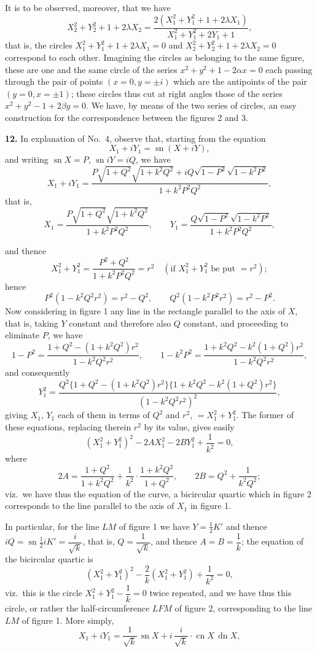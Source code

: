 \documentclass[11pt,a4paper]{article}
\providecommand{\sn}{\operatorname{sn}}
\providecommand{\cn}{\operatorname{cn}}
\providecommand{\dn}{\operatorname{dn}}
\begin{document}
It is to be observed, moreover, that we have
\[
X_2^2 + Y_2^2 + 1 + 2\lambda X_2 = \frac{2(X_1^2 + Y_1^2 + 1 + 2\lambda X_1)}{X_1^2 + Y_1^2 + 2 Y_1 + 1},
\]
that is, the circles $X_1^2 + Y_1^2 + 1 + 2\lambda X_1 = 0$ and $X_2^2 + Y_2^2 + 1 + 2\lambda X_2 = 0$ correspond to each other. Imagining the circles as belonging to the same figure, these are one and the same circle of the series $x^2 + y^2 + 1 - 2\alpha x = 0$ each passing through the pair of points $(x = 0, y = \pm i)$ which are the antipoints of the pair $(y = 0, x = \pm 1)$; these circles thus cut at right angles those of the series $x^2 + y^2 - 1 + 2\beta y = 0$. We have, by means of the two series of circles, an easy construction for the correspondence between the figures 2 and 3.

\textbf{12.} In explanation of No.~4, observe that, starting from the equation
\[
X_1 + i Y_1 = \sn(X + i Y),
\]
and writing $\sn X = P$, $\sn iY = i Q$, we have
\[
X_1 + i Y_1 = \frac{P\sqrt{1 + Q^2}\sqrt{1 + k^2 Q^2} + i Q\sqrt{1 - P^2}\sqrt{1 - k^2 P^2}}{1 + k^2 P^2 Q^2},
\]
that is,
\[
X_1 = \frac{P\sqrt{1 + Q^2}\sqrt{1 + k^2 Q^2}}{1 + k^2 P^2 Q^2}, \qquad Y_1 = \frac{Q\sqrt{1 - P^2}\sqrt{1 - k^2 P^2}}{1 + k^2 P^2 Q^2},
\]

and thence
\[
X_1^2 + Y_1^2 = \frac{P^2 + Q^2}{1 + k^2 P^2 Q^2} = r^2 \quad (\text{if } X_1^2 + Y_1^2 \text{ be put } = r^2);
\]
hence
\[
P^2(1 - k^2 Q^2 r^2) = r^2 - Q^2, \qquad Q^2(1 - k^2 P^2 r^2) = r^2 - P^2.
\]
Now considering in figure 1 any line in the rectangle parallel to the axis of $X$, that is, taking $Y$ constant and therefore also $Q$ constant, and proceeding to eliminate $P$, we have
\[
1 - P^2 = \frac{1 + Q^2 - (1 + k^2 Q^2) r^2}{1 - k^2 Q^2 r^2}, \qquad 1 - k^2 P^2 = \frac{1 + k^2 Q^2 - k^2(1 + Q^2) r^2}{1 - k^2 Q^2 r^2},
\]
and consequently
\[
Y_1^2 = \frac{Q^2 \{1 + Q^2 - (1 + k^2 Q^2) r^2\}\{1 + k^2 Q^2 - k^2(1 + Q^2) r^2\}}{(1 - k^2 Q^2 r^2)^2},
\]
giving $X_1$, $Y_1$ each of them in terms of $Q^2$ and $r^2$, $= X_1^2 + Y_1^2$. The former of these equations, replacing therein $r^2$ by its value, gives easily
\[
(X_1^2 + Y_1^2)^2 - 2 A X_1^2 - 2 B Y_1^2 + \frac{1}{k^2} = 0,
\]
where
\[
2A = \frac{1 + Q^2}{1 + k^2 Q^2} + \frac{1}{k^2}\cdot\frac{1 + k^2 Q^2}{1 + Q^2}, \qquad 2B = Q^2 + \frac{1}{k^2 Q^2};
\]
viz.\ we have thus the equation of the curve, a bicircular quartic which in figure 2 corresponds to the line parallel to the axis of $X_1$ in figure 1.

In particular, for the line $LM$ of figure 1 we have $Y = \tfrac{1}{2}K'$ and thence $i Q = \sn\tfrac{1}{2}iK' = \dfrac{i}{\sqrt{k}}$, that is, $Q = \dfrac{1}{\sqrt{k}}$, and thence $A = B = \dfrac{1}{k}$; the equation of the bicircular quartic is
\[
(X_1^2 + Y_1^2)^2 - \frac{2}{k}(X_1^2 + Y_1^2) + \frac{1}{k^2} = 0,
\]
viz.\ this is the circle $X_1^2 + Y_1^2 - \dfrac{1}{k} = 0$ twice repeated, and we have thus this circle, or rather the half-circumference $LFM$ of figure 2, corresponding to the line $LM$ of figure 1. More simply,
\[
X_1 + i Y_1 = \frac{1}{\sqrt{k}}\,\sn X + i\,\frac{i}{\sqrt{k}}\cdot\cn X\,\dn X,
\]
\end{document}
